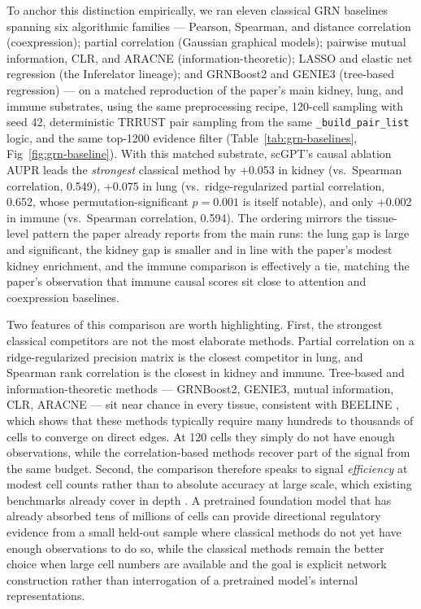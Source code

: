 \documentclass[10pt,letterpaper]{article}
\begin{document}
To anchor this distinction empirically, we ran eleven classical GRN
baselines spanning six algorithmic families --- Pearson, Spearman, and
distance correlation (coexpression); partial correlation (Gaussian
graphical models); pairwise mutual information, CLR, and ARACNE
(information-theoretic); LASSO and elastic net regression (the
Inferelator lineage); and GRNBoost2 and GENIE3 (tree-based regression) ---
on a matched reproduction of the paper's main kidney, lung, and immune
substrates, using the same preprocessing recipe, 120-cell sampling with
seed 42, deterministic TRRUST pair sampling from the same
\texttt{\_build\_pair\_list} logic, and the same top-1200 evidence
filter (Table~\ref{tab:grn-baselines}, Fig~\ref{fig:grn-baseline}). With this
matched substrate, scGPT's causal ablation AUPR leads the \emph{strongest}
classical method by +0.053 in kidney (vs.\ Spearman correlation, 0.549),
+0.075 in lung (vs.\ ridge-regularized partial correlation, 0.652, whose
permutation-significant $p{=}0.001$ is itself notable), and only +0.002 in
immune (vs.\ Spearman correlation, 0.594). The ordering mirrors the
tissue-level pattern the paper already reports from the main runs: the
lung gap is large and significant, the kidney gap is smaller and in line
with the paper's modest kidney enrichment, and the immune comparison is
effectively a tie, matching the paper's observation that immune causal
scores sit close to attention and coexpression baselines.

Two features of this comparison are worth highlighting. First, the
strongest classical competitors are not the most elaborate methods.
Partial correlation on a ridge-regularized precision matrix is the closest
competitor in lung, and Spearman rank correlation is the closest in kidney
and immune. Tree-based and information-theoretic methods --- GRNBoost2,
GENIE3, mutual information, CLR, ARACNE --- sit near chance in every
tissue, consistent with BEELINE \cite{pratapa_beeline_2020}, which shows
that these methods typically require many hundreds to thousands of cells
to converge on direct edges. At 120 cells they simply do not have enough
observations, while the correlation-based methods recover part of the
signal from the same budget. Second, the comparison therefore speaks to
signal \textit{efficiency} at modest cell counts rather than to absolute
accuracy at large scale, which existing benchmarks already cover in depth
\cite{marbach_dream5_2012,pratapa_beeline_2020,stock_streamline_2024}. A
pretrained foundation model that has already absorbed tens of millions of
cells can provide directional regulatory evidence from a small held-out
sample where classical methods do not yet have enough observations to do
so, while the classical methods remain the better choice when large cell
numbers are available and the goal is explicit network construction rather
than interrogation of a pretrained model's internal representations.
\end{document}
